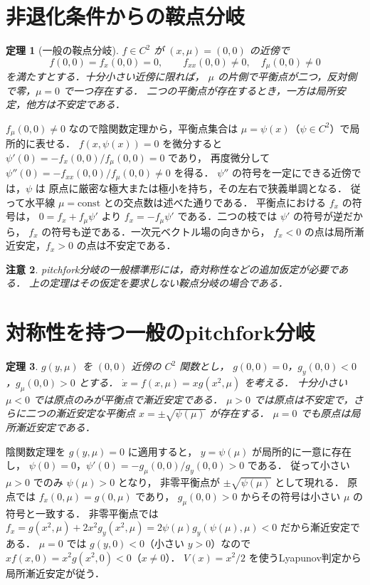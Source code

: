 \documentclass[a5paper,10pt,onecolumn]{jsarticle}
\makeatletter
\theoremstyle{mathnotetheorem}
\newtheorem{theorem}{定理}[section]
\newtheorem{remark}[theorem]{注意}
\renewcommand{\proofname}{証明}
\renewenvironment{proof}[1][\proofname]{%
  \par\pushQED{\qed}\normalfont\topsep4\p@\@plus2\p@\relax
  \trivlist\item[\hskip\labelsep\bfseries #1]\ignorespaces
}{\popQED\endtrivlist\@endpefalse}
\makeatother
\begin{document}
\section{非退化条件からの鞍点分岐}
\begin{theorem}[一般の鞍点分岐]
$f\in C^2$ が $(x,\mu)=(0,0)$ の近傍で
\[
 f(0,0)=f_x(0,0)=0,\qquad
 f_{xx}(0,0)\ne0,\quad f_\mu(0,0)\ne0
\]
を満たすとする．十分小さい近傍に限れば，
$\mu$ の片側で平衡点が二つ，反対側で零，$\mu=0$ で一つ存在する．
二つの平衡点が存在するとき，一方は局所安定，他方は不安定である．
\end{theorem}
\begin{proof}
$f_\mu(0,0)\ne0$ なので陰関数定理から，平衡点集合は
$\mu=\psi(x)$（$\psi\in C^2$）で局所的に表せる．
$f(x,\psi(x))=0$ を微分すると
$\psi'(0)=-f_x(0,0)/f_\mu(0,0)=0$ であり，
再度微分して
$\psi''(0)=-f_{xx}(0,0)/f_\mu(0,0)\ne0$ を得る．
$\psi''$ の符号を一定にできる近傍では，$\psi$ は
原点に厳密な極大または極小を持ち，その左右で狭義単調となる．
従って水平線 $\mu=\mathrm{const}$ との交点数は述べた通りである．
平衡点における $f_x$ の符号は，
$0=f_x+f_\mu\psi'$ より
$f_x=-f_\mu\psi'$ である．二つの枝では $\psi'$ の符号が逆だから，
$f_x$ の符号も逆である．一次元ベクトル場の向きから，
$f_x<0$ の点は局所漸近安定，$f_x>0$ の点は不安定である．
\end{proof}
\begin{remark}
pitchfork分岐の一般標準形には，奇対称性などの追加仮定が必要である．
上の定理はその仮定を要求しない鞍点分岐の場合である．
\end{remark}
\section{対称性を持つ一般のpitchfork分岐}
\begin{theorem}
$g(y,\mu)$ を $(0,0)$ 近傍の $C^2$ 関数とし，
$g(0,0)=0$，$g_y(0,0)<0$，$g_\mu(0,0)>0$ とする．
$\dot x=f(x,\mu)=xg(x^2,\mu)$ を考える．
十分小さい $\mu<0$ では原点のみが平衡点で漸近安定である．
$\mu>0$ では原点は不安定で，さらに二つの漸近安定な平衡点
$x=\pm\sqrt{\psi(\mu)}$ が存在する．
$\mu=0$ でも原点は局所漸近安定である．
\end{theorem}
\begin{proof}
陰関数定理を $g(y,\mu)=0$ に適用すると，
$y=\psi(\mu)$ が局所的に一意に存在し，
$\psi(0)=0$，$\psi'(0)=-g_\mu(0,0)/g_y(0,0)>0$ である．
従って小さい $\mu>0$ でのみ $\psi(\mu)>0$ となり，
非零平衡点が $\pm\sqrt{\psi(\mu)}$ として現れる．
原点では $f_x(0,\mu)=g(0,\mu)$ であり，
$g_\mu(0,0)>0$ からその符号は小さい $\mu$ の符号と一致する．
非零平衡点では
$f_x=g(x^2,\mu)+2x^2g_y(x^2,\mu)
=2\psi(\mu)g_y(\psi(\mu),\mu)<0$ だから漸近安定である．
$\mu=0$ では $g(y,0)<0$（小さい $y>0$）なので
$x f(x,0)=x^2 g(x^2,0)<0$（$x\ne0$）．
$V(x)=x^2/2$ を使うLyapunov判定から局所漸近安定が従う．
\end{proof}
\end{document}
